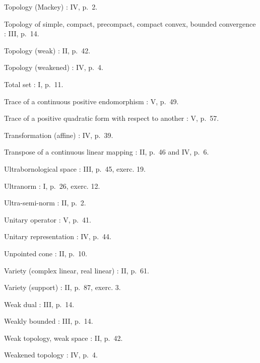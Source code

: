 Topology (Mackey) : IV, p.~2.

Topology of simple, compact, precompact, compact convex, bounded convergence : III, p.~14.

Topology (weak) : II, p.~42.

Topology (weakened) : IV, p.~4.

Total set : I, p.~11.

Trace of a continuous positive endomorphism : V, p.~49.

Trace of a positive quadratic form with respect to another : V, p.~57.

Transformation (affine) : IV, p.~39.

Transpose of a continuous linear mapping : II, p.~46 and IV, p.~6.

Ultrabornological space : III, p.~45, exerc. 19.

Ultranorm : I, p.~26, exerc. 12.

Ultra-semi-norm : II, p.~2.

Unitary operator : V, p.~41.

Unitary representation : IV, p.~44.

Unpointed cone : II, p.~10.

Variety (complex linear, real linear) : II, p.~61.

Variety (support) : II, p.~87, exerc. 3.

Weak dual : III, p.~14.

Weakly bounded : III, p.~14.

Weak topology, weak space : II, p.~42.

Weakened topology : IV, p.~4.


